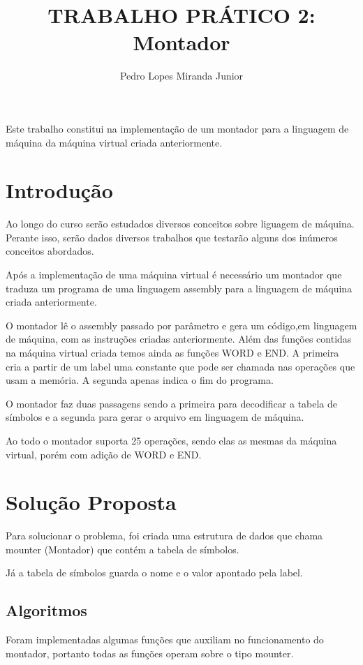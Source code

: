 \documentclass[12pt]{article}
\title{TRABALHO PRÁTICO 2: \\ Montador}
\author{Pedro Lopes Miranda Junior}
\begin{document}
\maketitle

\begin{resumo} 
Este trabalho constitui na implementação de um montador para a linguagem de
máquina da máquina virtual criada anteriormente.
\end{resumo}

\section{Introdução}
\label{introducao}
Ao longo do curso serão estudados diversos conceitos sobre liguagem de máquina.
Perante isso, serão dados diversos trabalhos que testarão alguns dos inúmeros
conceitos abordados.

Após a implementação de uma máquina virtual é necessário um montador que
traduza um programa de uma linguagem assembly para a linguagem de máquina
criada anteriormente.

O montador lê o assembly passado por parâmetro e gera um código,em linguagem de
máquina, com as instruções criadas anteriormente. Além das funções contidas na
máquina virtual criada temos ainda as funções WORD e END.
A primeira cria a partir de um label uma constante que pode ser chamada nas
operações que usam a memória. A segunda apenas indica o fim do programa.

O montador faz duas passagens sendo a primeira para decodificar a tabela de
símbolos e a segunda para gerar o arquivo em linguagem de máquina.

Ao todo o montador suporta 25 operações, sendo elas as mesmas da máquina
virtual, porém com adição de WORD e END.

\section{Solução Proposta}
\label{solucao_proposta}
Para solucionar o problema, foi criada uma estrutura de dados que chama
mounter (Montador) que contém a tabela de símbolos.

Já a tabela de símbolos guarda o nome e o valor apontado pela label.

\subsection{Algoritmos}

Foram implementadas algumas funções que auxiliam no funcionamento do montador, 
portanto todas as funções operam sobre o tipo mounter.
\end{document}
